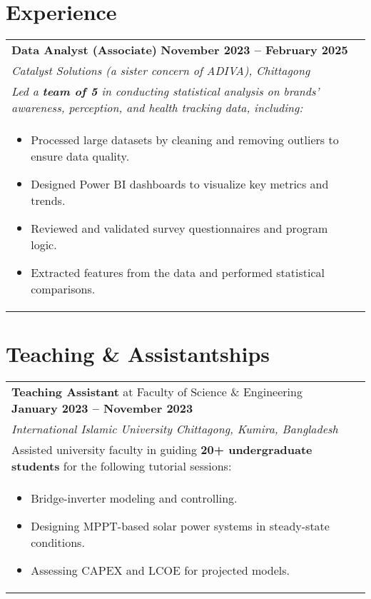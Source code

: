 \documentclass[a4paper,11pt]{article}
\begin{document}
\section{Experience}
\begin{tabularx}{\linewidth}{@{}L @{}R}
\textbf{Data Analyst (Associate)} \hfill \textbf{November 2023 -- February 2025} \\[4pt]

\emph{Catalyst Solutions (a sister concern of ADIVA), Chittagong}\\[4pt]
\textit{Led a \textbf{team of 5} in conducting statistical analysis on brands’ awareness, perception, and health tracking data, including:}\\[4pt]
\begin{minipage}[t]{\linewidth}
    \begin{itemize}[nosep,after=\strut, leftmargin=1em, itemsep=2pt]
        \item Processed large datasets by cleaning and removing outliers to ensure data quality.
        \item Designed Power BI dashboards to visualize key metrics and trends.
        \item Reviewed and validated survey questionnaires and program logic.
        \item Extracted features from the data and performed statistical comparisons.
    \end{itemize}
\end{minipage}
\end{tabularx}

\vspace{2mm}

\section{Teaching \& Assistantships}
\begin{tabularx}{\linewidth}{@{}L @{}R}
\textbf{Teaching Assistant} at Faculty of Science \& Engineering \hfill \textbf{January 2023 -- November 2023}\\[4pt]
\emph{International Islamic University Chittagong, Kumira, Bangladesh}\\[4pt]
Assisted university faculty in guiding \textbf{20+ undergraduate students} for the following tutorial sessions:\\[4pt]
\begin{minipage}[t]{\linewidth}
    \begin{itemize}[nosep,after=\strut, leftmargin=1em, itemsep=2pt]
        \item Bridge-inverter modeling and controlling.
        \item Designing MPPT-based solar power systems in steady-state conditions.
        \item Assessing CAPEX and LCOE for projected models.
    \end{itemize}
\end{minipage}
\end{tabularx}
\end{document}
